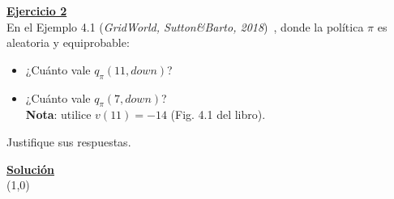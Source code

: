 \indent\underline{\textbf{Ejercicio 2}}\\
En el Ejemplo 4.1 (\textit{GridWorld, Sutton\&Barto, 2018})~\cite{Sutton2018}, donde la política $\pi$ es aleatoria y equiprobable:

\begin{itemize}
    \item ¿Cuánto vale $q_{\pi}(11,down)$?
    \item ¿Cuánto vale $q_{\pi}(7,down)$? \\ \textbf{Nota}: utilice $v(11)=-14$ (Fig. 4.1 del libro).
\end{itemize}

Justifique sus respuestas.

\indent\underline{\textbf{Solución}}\\

\line(1,0){\textwidth}
